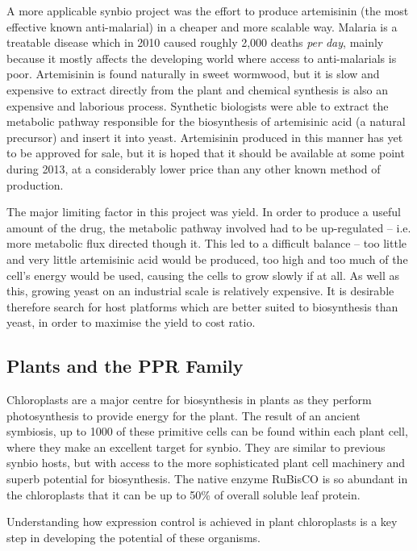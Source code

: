 A more applicable synbio project was the effort to produce 
artemisinin (the most effective known anti-malarial) in a cheaper and more 
scalable way.
Malaria is a treatable disease which in 2010 caused roughly 2,000 deaths 
\emph{per day}, mainly because it mostly affects the developing world where
access to anti-malarials is poor.
Artemisinin is found naturally in sweet wormwood, but it is slow and expensive
to extract directly from the plant and chemical synthesis is also an expensive
and laborious process.
Synthetic biologists were able to extract the metabolic pathway responsible for
the biosynthesis of artemisinic acid (a natural precursor) and insert it into 
yeast\cite{yeast}.
Artemisinin produced in this manner has yet to be approved for sale, but it is
hoped that it should be available at some point during 2013, at a considerably
lower price than any other known method of production.

The major limiting factor in this project was yield.
In order to produce a useful amount of the drug, the metabolic pathway 
involved had to be up-regulated -- i.e. more metabolic flux directed though it.
This led to a difficult balance -- too little and very little
artemisinic acid would be produced, too high and too much of the cell's
energy would be used, causing the cells to grow slowly if at all.
As well as this, growing yeast on an industrial scale is relatively expensive.
It is desirable therefore search for host platforms which are better suited to
biosynthesis than yeast, in order to maximise the yield to cost ratio.

\subsection{Plants and the PPR Family}
\label{sec:intro_plants}

Chloroplasts are a major centre for biosynthesis in plants as they perform
photosynthesis to provide energy for the plant.
The result of an ancient symbiosis, up to 1000 of these primitive cells can be 
found within each plant cell, where they make an excellent target for synbio.
They are similar to previous synbio hosts, but with access to the more
sophisticated plant cell machinery and superb potential for biosynthesis.
The native enzyme RuBisCO is so abundant in the chloroplasts that it 
can be up to 50\% of overall soluble leaf protein.

Understanding how expression control is achieved in plant chloroplasts is a key
step in developing the potential of these organisms.


